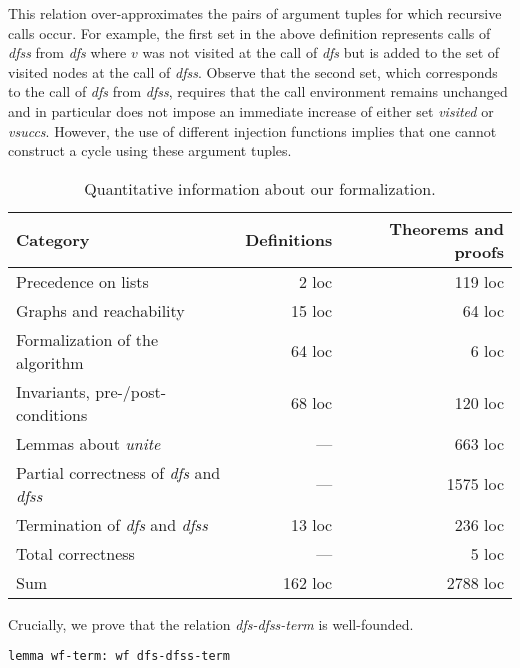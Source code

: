 \documentclass[sigplan,10pt,anonymous,review]{acmart}
\newcommand{\prog}[1]{\textit{#1}}
\begin{document}
This relation over-approximates the pairs of argument tuples for which recursive calls occur. For example, the first set in the above definition represents calls of \prog{dfss} from \prog{dfs} where $v$ was not visited at the call of \prog{dfs} but is added to the set of visited nodes at the call of \prog{dfss}. Observe that the second set, which corresponds to the call of \prog{dfs} from \prog{dfss}, requires that the call environment remains unchanged and in particular does not impose an immediate increase of either set \prog{visited} or \prog{vsuccs}. However, the use of different injection functions implies that one cannot construct a cycle using these argument tuples.

\begin{table*}
  \centering
  \begin{tabular}{|l|r|r|}
    \hline
    Category                         &  Definitions   &  Theorems and proofs\\
    \hline\hline
    Precedence on lists              &        2 loc   &         119 loc\\
    \hline
    Graphs and reachability          &       15 loc   &          64 loc\\
    \hline
    Formalization of the algorithm   &       64 loc   &           6 loc\\
    \hline
    Invariants, pre-/post-conditions &       68 loc   &         120 loc\\
    \hline
    Lemmas about \prog{unite}        &          ---   &         663 loc\\
    \hline
    Partial correctness of \prog{dfs} and \prog{dfss} & --- &  1575 loc\\
    \hline
    Termination of \prog{dfs} and \prog{dfss} & 13 loc   &      236 loc\\
    \hline
    Total correctness                &          ---   &           5 loc\\
    \hline\hline
    Sum                              &      162 loc   &        2788 loc\\
    \hline
  \end{tabular}
  \caption{Quantitative information about our formalization.}
  \label{tab:effort}
\end{table*}

Crucially, we prove that the relation \prog{dfs-dfss-term} is well-founded.

\begin{small}
\begin{lstlisting}[language=isabelle]
lemma wf-term: wf dfs-dfss-term
\end{lstlisting}
\end{small}
\end{document}
